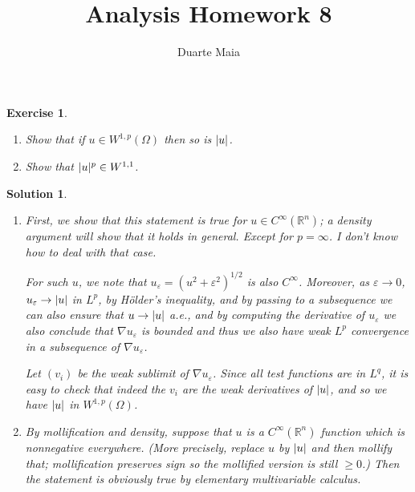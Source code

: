 \documentclass{article}
\title{Analysis Homework 8}
\author{Duarte Maia}
\newtheorem{ex}{Exercise}
\theoremstyle{nonumberplain}
\newtheorem{sol}{Solution}
\newcommand{\R}{\mathbb{R}}
\newcommand{\grad}{\nabla}
\DeclarePairedDelimiter{\abs}{\lvert}{\rvert}
\begin{document}
\maketitle

\setcounter{ex}{2}

\begin{ex}
\leavevmode
\begin{enumerate}
\item Show that if $u \in W^{1,p}(\Omega)$ then so is $\abs{u}$.
\item Show that $\abs{u}^p \in W^{1,1}$.
\end{enumerate}
\end{ex}

\begin{sol}
\leavevmode
\begin{enumerate}
\item First, we show that this statement is true for $u \in C^{\infty}(\R^n)$; a density argument will show that it holds in general. Except for $p = \infty$. I don't know how to deal with that case.

For such $u$, we note that $u_{\varepsilon} = (u^2 + \varepsilon^2)^{1/2}$ is also $C^\infty$. Moreover, as $\varepsilon \to 0$, $u_\varepsilon \to \abs{u}$ in $L^p$, by Hölder's inequality, and by passing to a subsequence we can also ensure that $u \to \abs{u}$ a.e., and by computing the derivative of $u_\varepsilon$ we also conclude that $\grad u_\varepsilon$ is bounded and thus we also have weak $L^p$ convergence in a subsequence of $\grad u_{\varepsilon}$.

Let $(v_i)$ be the weak sublimit of $\grad u_\varepsilon$. Since all test functions are in $L^q$, it is easy to check that indeed the $v_i$ are the weak derivatives of $\abs u$, and so we have $\abs u$ in $W^{1,p}(\Omega)$.

\item By mollification and density, suppose that $u$ is a $C^\infty(\R^n)$ function which is nonnegative everywhere. (More precisely, replace $u$ by $\abs{u}$ and then mollify that; mollification preserves sign so the mollified version is still $\geq 0$.) Then the statement is obviously true by elementary multivariable calculus.
\end{enumerate}
\end{sol}
\end{document}
